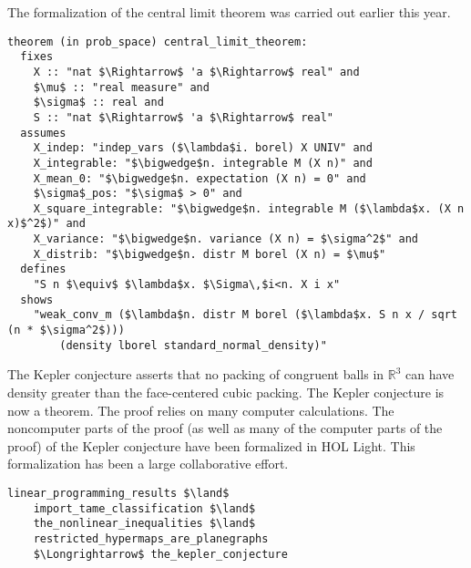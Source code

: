 \documentclass[brochure,english,12pt]{bourbaki}
\theoremstyle{plain}
\def\ring#1{{\mathbb{#1}}}
\begin{document}
The formalization of the central limit theorem was carried out earlier this year.

\begin{lstlisting}[keepspaces=true,stringstyle=\tt,basicstyle=\small,frame=single,framesep=8pt,mathescape,morekeywords={theorem,fixes,assumes,defines,shows,Variable,Theorem,Proof,Qed},columns=flexible,caption={The central limit theorem in Isabelle}]
theorem (in prob_space) central_limit_theorem:
  fixes 
    X :: "nat $\Rightarrow$ 'a $\Rightarrow$ real" and
    $\mu$ :: "real measure" and
    $\sigma$ :: real and
    S :: "nat $\Rightarrow$ 'a $\Rightarrow$ real"
  assumes
    X_indep: "indep_vars ($\lambda$i. borel) X UNIV" and
    X_integrable: "$\bigwedge$n. integrable M (X n)" and
    X_mean_0: "$\bigwedge$n. expectation (X n) = 0" and
    $\sigma$_pos: "$\sigma$ > 0" and
    X_square_integrable: "$\bigwedge$n. integrable M ($\lambda$x. (X n x)$^2$)" and
    X_variance: "$\bigwedge$n. variance (X n) = $\sigma^2$" and
    X_distrib: "$\bigwedge$n. distr M borel (X n) = $\mu$"
  defines
    "S n $\equiv$ $\lambda$x. $\Sigma\,$i<n. X i x"
  shows
    "weak_conv_m ($\lambda$n. distr M borel ($\lambda$x. S n x / sqrt (n * $\sigma^2$))) 
        (density lborel standard_normal_density)"
\end{lstlisting}



The Kepler conjecture asserts that no packing of congruent balls in $\ring{R}^3$ can have density greater than
the face-centered cubic packing.  The Kepler conjecture is now a theorem.  The proof relies on many computer
calculations.  The noncomputer parts of the proof (as well as many of the computer parts of the proof) of the Kepler conjecture 
have been formalized in HOL Light.  This formalization has been a large collaborative effort.

\begin{lstlisting}[keepspaces=true,stringstyle=\tt,basicstyle=\small,frame=single,framesep=8pt,framextopmargin=10pt,mathescape,morekeywords={Variable,Theorem,Proof,Qed},columns=flexible,caption={The formal proof of the Kepler conjecture in HOL Light}]
    linear_programming_results $\land$      
    import_tame_classification $\land$      
    the_nonlinear_inequalities $\land$
    restricted_hypermaps_are_planegraphs    
    $\Longrightarrow$ the_kepler_conjecture
\end{lstlisting}
\end{document}
